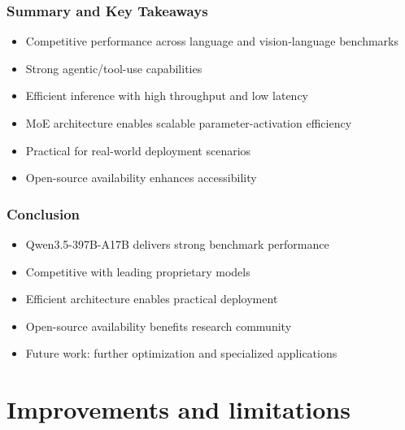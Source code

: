 \begin{frame}

\frametitle{Summary and Key Takeaways}

\begin{itemize}
\item Competitive performance across language and vision-language benchmarks
\item Strong agentic/tool-use capabilities
\item Efficient inference with high throughput and low latency
\item MoE architecture enables scalable parameter-activation efficiency
\item Practical for real-world deployment scenarios
\item Open-source availability enhances accessibility
\end{itemize}
\end{frame}%
\begin{frame}

\frametitle{Conclusion}

\begin{itemize}
\item Qwen3.5-397B-A17B delivers strong benchmark performance
\item Competitive with leading proprietary models
\item Efficient architecture enables practical deployment
\item Open-source availability benefits research community
\item Future work: further optimization and specialized applications
\end{itemize}
\end{frame}%
\section{Improvements and limitations}%
